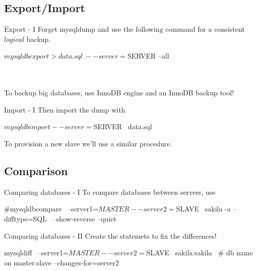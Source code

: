 \documentclass{beamer}[10]
\begin{document}
%
%
\subsection{Export/Import}

\begin{pyframe}{Export - I}
Forget mysqldump and use the following
command for a consistent $logical$ backup.
\begin{bashcode}
$ mysqldbexport > data.sql \
    --server=$SERVER
    --all
\end{bashcode}
\\ \\
{
\large
To backup big databases, use InnoDB engine and an InnoDB backup tool!
}
\end{pyframe}


\begin{pyframe}{Import - I}
Then import the dump with
\begin{bashcode}
$ mysqldbimport --server=$SERVER \
    data.sql
\end{bashcode}
To provision a new slave we'll use a similar
procedure.
\end{pyframe}


%
%
\subsection{Comparison}
\begin{pyframe}{Comparing databases - I}
To compare databases between servers, use
\begin{bashcode}
#mysqldbcompare \
    --server1=$MASTER --server2=$SLAVE \
    sakila -a --difftype=SQL \
    --show-reverse --quiet
\end{bashcode}

\end{pyframe}


\begin{pyframe}{Comparing databases - II}
Create the statemets to fix the differences!
\begin{bashcode}
mysqldiff \
    --server1=$MASTER --server2=$SLAVE \
    sakila:sakila \ # db name on master:slave
    --changes-for=server2
\end{bashcode}
\end{pyframe}


%
%
\end{document}
